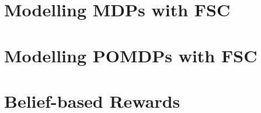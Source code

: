 \section{Modelling MDPs with FSC}

\section{Modelling POMDPs with FSC}

\section{Belief-based Rewards}